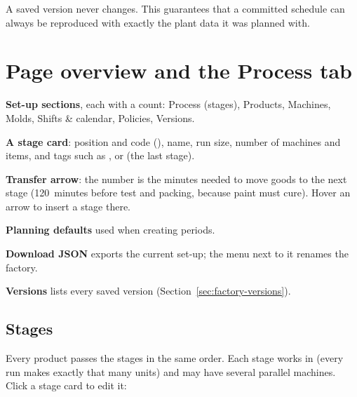 \begin{note}
A saved version never changes. This guarantees that a committed schedule can always be reproduced with
exactly the plant data it was planned with.
\end{note}

\section{Page overview and the Process tab}\label{sec:process}


\begin{callouts}
  \item[1] \textbf{Set-up sections}, each with a count: Process (stages), Products, Machines, Molds, Shifts
           \& calendar, Policies, Versions.
  \item[2] \textbf{A stage card}: position and code (), name, run size, number of machines and
           items, and tags such as ,  or  (the last stage).
  \item[3] \textbf{Transfer arrow}: the number is the minutes needed to move goods to the next stage
           (120~minutes before test and packing, because paint must cure). Hover an arrow to insert a stage
           there.
  \item[4] \textbf{Planning defaults} used when creating periods.
  \item[5] \textbf{Download JSON} exports the current set-up; the \ui{\dots} menu next to it renames the
           factory.
  \item[6] \textbf{Versions} lists every saved version (Section~\ref{sec:factory-versions}).
\end{callouts}

\subsection{Stages}

Every product passes the stages in the same order. Each stage works in  (every run
makes exactly that many units) and may have several parallel machines. Click a stage card to edit it:


